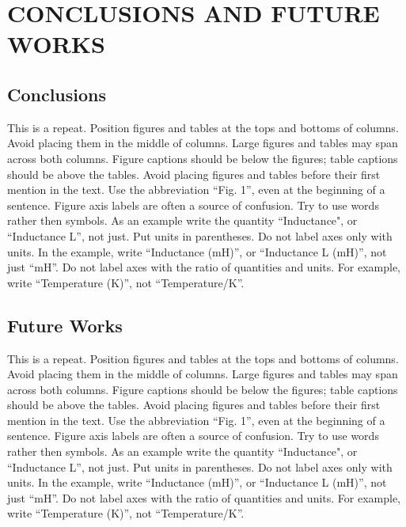 \documentclass[letterpaper, 10 pt, conference]{ieeeconf}  %
\begin{document}
\section{CONCLUSIONS AND FUTURE WORKS}

\subsection{Conclusions}

This is a repeat.
Position figures and tables at the tops and bottoms of columns.
Avoid placing them in the middle of columns. Large figures and tables
may span across both columns. Figure captions should be below the figures;
 table captions should be above the tables. Avoid placing figures and tables
  before their first mention in the text. Use the abbreviation ``Fig. 1'',
  even at the beginning of a sentence.
Figure axis labels are often a source of confusion.
Try to use words rather then symbols. As an example write the quantity ``Inductance",
 or ``Inductance L'', not just.
 Put units in parentheses. Do not label axes only with units.
 In the example, write ``Inductance (mH)'', or ``Inductance L (mH)'', not just ``mH''.
 Do not label axes with the ratio of quantities and units.
 For example, write ``Temperature (K)'', not ``Temperature/K''.


\subsection{Future Works}

This is a repeat.
Position figures and tables at the tops and bottoms of columns.
Avoid placing them in the middle of columns. Large figures and tables
may span across both columns. Figure captions should be below the figures;
 table captions should be above the tables. Avoid placing figures and tables
  before their first mention in the text. Use the abbreviation ``Fig. 1'',
  even at the beginning of a sentence.
Figure axis labels are often a source of confusion.
Try to use words rather then symbols. As an example write the quantity ``Inductance",
 or ``Inductance L'', not just.
 Put units in parentheses. Do not label axes only with units.
 In the example, write ``Inductance (mH)'', or ``Inductance L (mH)'', not just ``mH''.
 Do not label axes with the ratio of quantities and units.
 For example, write ``Temperature (K)'', not ``Temperature/K''.

\end{document}
